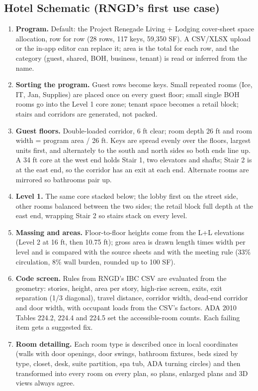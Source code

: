 \documentclass[10pt]{article}
\begin{document}
\subsection{Hotel Schematic (RNGD's first use case)}
\begin{enumerate}
\item \textbf{Program.} Default: the Project Renegade Living + Lodging cover-sheet space allocation, row for row (28 rows, 117 keys, 59,350 SF). A CSV/XLSX upload or the in-app editor can replace it; area is the total for each row, and the category (guest, shared, BOH, business, tenant) is read or inferred from the name.
\item \textbf{Sorting the program.} Guest rows become keys. Small repeated rooms (Ice, IT, Jan, Supplies) are placed once on every guest floor; small single BOH rooms go into the Level 1 core zone; tenant space becomes a retail block; stairs and corridors are generated, not packed.
\item \textbf{Guest floors.} Double-loaded corridor, 6 ft clear; room depth 26 ft and room width = program area / 26 ft. Keys are spread evenly over the floors, largest units first, and alternately to the south and north sides so both ends line up. A 34 ft core at the west end holds Stair 1, two elevators and shafts; Stair 2 is at the east end, so the corridor has an exit at each end. Alternate rooms are mirrored so bathrooms pair up.
\item \textbf{Level 1.} The same core stacked below; the lobby first on the street side, other rooms balanced between the two sides; the retail block full depth at the east end, wrapping Stair 2 so stairs stack on every level.
\item \textbf{Massing and areas.} Floor-to-floor heights come from the L+L elevations (Level 2 at 16 ft, then 10.75 ft); gross area is drawn length times width per level and is compared with the source sheets and with the meeting rule (33\% circulation, 8\% wall burden, rounded up to 100 SF).
\item \textbf{Code screen.} Rules from RNGD's IBC CSV are evaluated from the geometry: stories, height, area per story, high-rise screen, exits, exit separation (1/3 diagonal), travel distance, corridor width, dead-end corridor and door width, with occupant loads from the CSV's factors. ADA 2010 Tables 224.2, 224.4 and 224.5 set the accessible-room counts. Each failing item gets a suggested fix.
\item \textbf{Room detailing.} Each room type is described once in local coordinates (walls with door openings, door swings, bathroom fixtures, beds sized by type, closet, desk, suite partition, spa tub, ADA turning circles) and then transformed into every room on every plan, so plans, enlarged plans and 3D views always agree.

\end{enumerate}
\end{document}
